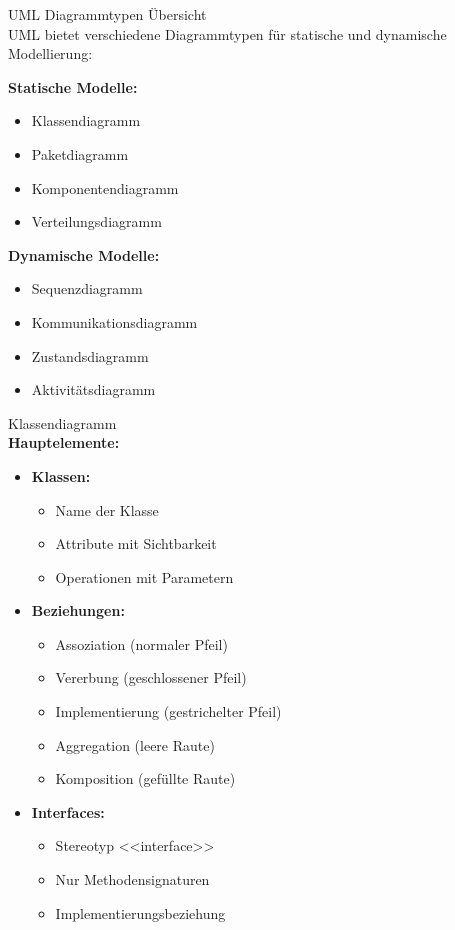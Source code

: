 \begin{concept}{UML Diagrammtypen Übersicht}\\
UML bietet verschiedene Diagrammtypen für statische und dynamische Modellierung:

\textbf{Statische Modelle:}
\begin{itemize}
    \item Klassendiagramm
    \item Paketdiagramm
    \item Komponentendiagramm
    \item Verteilungsdiagramm
\end{itemize}

\textbf{Dynamische Modelle:}
\begin{itemize}
    \item Sequenzdiagramm
    \item Kommunikationsdiagramm
    \item Zustandsdiagramm
    \item Aktivitätsdiagramm
\end{itemize}
\end{concept}

\begin{definition}{Klassendiagramm}\\
\textbf{Hauptelemente:}
\begin{itemize}
    \item \textbf{Klassen:}
    \begin{itemize}
        \item Name der Klasse
        \item Attribute mit Sichtbarkeit
        \item Operationen mit Parametern
    \end{itemize}
    
    \item \textbf{Beziehungen:}
    \begin{itemize}
        \item Assoziation (normaler Pfeil)
        \item Vererbung (geschlossener Pfeil)
        \item Implementierung (gestrichelter Pfeil)
        \item Aggregation (leere Raute)
        \item Komposition (gefüllte Raute)
    \end{itemize}
    
    \item \textbf{Interfaces:}
    \begin{itemize}
        \item Stereotyp <<interface>>
        \item Nur Methodensignaturen
        \item Implementierungsbeziehung
    \end{itemize}
\end{itemize}
\end{definition}

